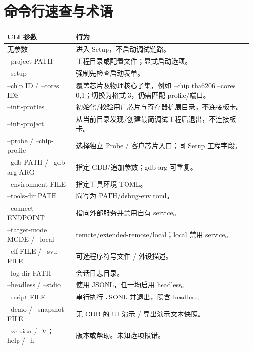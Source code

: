 \documentclass[UTF8,a4paper,11pt,oneside,fontset=none]{ctexart}
\newcommand{\newsection}[1]{\par\Needspace{10\baselineskip}\section{#1}}
\begin{document}
\newsection{命令行速查与术语}
\begin{longtable}{@{}P{45mm}P{116mm}@{}}\toprule
CLI 参数 & 行为\\\midrule\endhead
无参数 & 进入 Setup，不启动调试链路。\\
--project PATH & 工程目录或配置文件；显式启动选项。\\
--setup & 强制先检查启动表单。\\
--chip ID / --cores IDS & 覆盖芯片及物理核心子集，例如 --chip tha6206 --cores 0,1；切换为格式 3，仍需匹配 profile/端口。\\
--init-profiles & 初始化/校验用户芯片与寄存器扩展目录，不连接板卡。\\
--init-project & 从当前目录发现/创建最简调试工程后退出，不连接板卡。\\
--probe / --chip-profile & 选择独立 Probe / 客户芯片入口；同 Setup 工程字段。\\
--gdb PATH / --gdb-arg ARG & 指定 GDB/追加参数；gdb-arg 可重复。\\
--environment FILE & 指定工具环境 TOML。\\
--tools-dir PATH & 简写为 PATH/debug-env.toml。\\
--connect ENDPOINT & 指向外部服务并禁用自有 service。\\
--target-mode MODE / --local & remote/extended-remote/local；local 禁用 service。\\
--elf FILE / --svd FILE & 可选程序符号文件 / 外设描述。\\
--log-dir PATH & 会话日志目录。\\
--headless / --stdio & 使用 JSONL，任一均启用 headless。\\
--script FILE & 串行执行 JSONL 并退出，隐含 headless。\\
--demo / --snapshot FILE & 无 GDB 的 UI 演示 / 导出演示文本快照。\\
--version / -V；--help / -h & 版本或帮助。未知选项报错。\\\bottomrule
\end{longtable}
\end{document}
